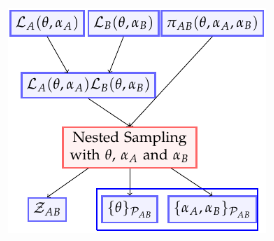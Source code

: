 \documentclass[aspectratio=169]{beamer}
\begin{document}
\begin{frame}
\begin{columns}
        \includegraphics[width=0.7\textwidth]{figures/full_margarine.pdf}


\end{columns}
\end{frame}
\end{document}
